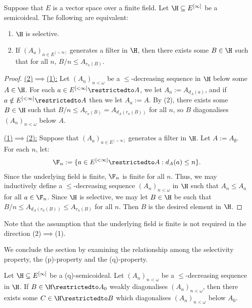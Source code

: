 \documentclass[11pt,reqno]{amsart}
\begin{document}
\begin{lemma}
    Suppose that $E$ is a vector space over a finite field. Let $\H \subseteq E^{[\infty]}$ be a semicoideal. The following are equivalent:
    \begin{enumerate}
        \item $\H$ is selective.
        
        \item If $(A_a)_{a \in E^{[<\infty]}}$ generates a filter in $\H$, then there exists some $B \in \H$ such that for all $n$, $B/n \leq A_{r_n(B)}$. 
    \end{enumerate}
\end{lemma}

\begin{proof}
    \underline{(2)$\implies$(1):} Let $(A_n)_{n<\omega}$ be a $\leq$-decreasing sequence in $\H$ below some $A \in \H$. For each $a \in E^{[<\infty]}\restrictedto A$, we let $A_a := A_{d_A(a)}$, and if $a \notin E^{[<\infty]}\restrictedto A$ then we let $A_a := A$. By (2), there exists some $B \in \H$ such that $B/n \leq A_{r_n(B)} = A_{d_A(r_n(B))}$ for all $n$, so $B$ diagonalises $(A_n)_{n<\omega}$ below $A$. 

    \underline{(1)$\implies$(2):} Suppose that $(A_a)_{a \in E^{[<\infty]}}$ generates a filter in $\H$. Let $A := A_\emptyset$. For each $n$, let:
    \begin{align*}
        \F_n := \{a \in E^{[<\infty]}\restrictedto A : d_A(a) \leq n\}.
    \end{align*}
    Since the underlying field is finite, $\F_n$ is finite for all $n$. Thus, we may inductively define a $\leq$-decreasing sequence $(A_n)_{n<\omega}$ in $\H$ such that $A_n \leq A_a$ for all $a \in \F_n$. Since $\H$ is selective, we may let $B \in \H$ be such that $B/n \leq A_{d_A(r_n(B))} \leq A_{r_n(B)}$ for all $n$. Then $B$ is the desired element in $\H$.
\end{proof}

Note that the assumption that the underlying field is finite is not required in the direction (2)$\implies$(1).

We conclude the section by examining the relationship among the selectivity property, the (p)-property and the (q)-property.

\begin{lemma}
\label{lem:(q)-property.refines.diagonalisation}
    Let $\H \subseteq E^{[\infty]}$ be a (q)-semicoideal. Let $(A_n)_{n<\omega}$ be a $\leq$-decreasing sequence in $\H$. If $B \in \H\restrictedto A_0$ weakly diagonalises $(A_n)_{n<\omega}$, then there exists some $C \in \H\restrictedto B$ which diagonalises $(A_n)_{n<\omega}$ below $A_0$.
\end{lemma}
\end{document}
